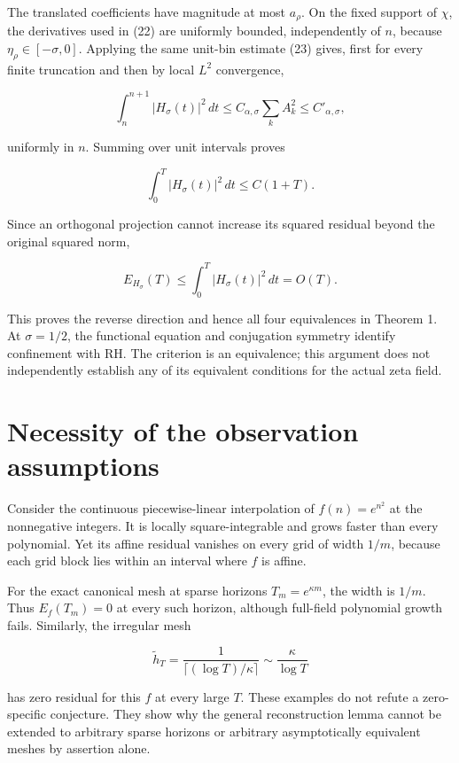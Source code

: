 \documentclass[
  11pt,
]{article}
\begin{document}
The translated coefficients have magnitude at most \(a_\rho\). On the
fixed support of \(\chi\), the derivatives used in (22) are uniformly
bounded, independently of \(n\), because \(\eta_\rho\in[-\sigma,0]\).
Applying the same unit-bin estimate (23) gives, first for every finite
truncation and then by local \(L^2\) convergence,

\[
\int_n^{n+1}|H_\sigma(t)|^2\,dt
\le C_{\alpha,\sigma}\sum_k A_k^2
\le C'_{\alpha,\sigma}, \tag{28}
\]

uniformly in \(n\). Summing over unit intervals proves

\[
\int_0^T|H_\sigma(t)|^2\,dt\le C(1+T). \tag{29}
\]

Since an orthogonal projection cannot increase its squared residual
beyond the original squared norm,

\[
E_{H_\sigma}(T)\le\int_0^T|H_\sigma(t)|^2\,dt=O(T).
\]

This proves the reverse direction and hence all four equivalences in
Theorem 1. At \(\sigma=1/2\), the functional equation and conjugation
symmetry identify confinement with RH. The criterion is an equivalence;
this argument does not independently establish any of its equivalent
conditions for the actual zeta field.

\hypertarget{necessity-of-the-observation-assumptions}{%
\section{Necessity of the observation
assumptions}\label{necessity-of-the-observation-assumptions}}

Consider the continuous piecewise-linear interpolation of
\(f(n)=e^{n^2}\) at the nonnegative integers. It is locally
square-integrable and grows faster than every polynomial. Yet its affine
residual vanishes on every grid of width \(1/m\), because each grid
block lies within an interval where \(f\) is affine.

For the exact canonical mesh at sparse horizons \(T_m=e^{\kappa m}\),
the width is \(1/m\). Thus \(E_f(T_m)=0\) at every such horizon,
although full-field polynomial growth fails. Similarly, the irregular
mesh

\[
\widetilde h_T=\frac{1}{\lceil(\log T)/\kappa\rceil}
\sim\frac{\kappa}{\log T}
\]

has zero residual for this \(f\) at every large \(T\). These examples do
not refute a zero-specific conjecture. They show why the general
reconstruction lemma cannot be extended to arbitrary sparse horizons or
arbitrary asymptotically equivalent meshes by assertion alone.
\end{document}
